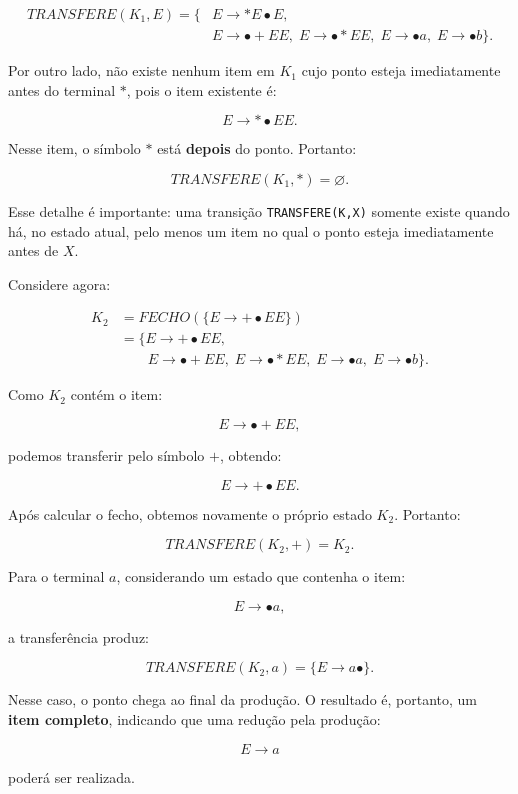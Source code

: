 \documentclass[
  brazilian,
  letterpaper,
]{book}
\theoremstyle{plain}
\theoremstyle{definition}
\theoremstyle{remark}
\begin{document}
\[
\begin{aligned}
TRANSFERE(K_1,E)=\{&
E\rightarrow*E\bullet E,\\
&
E\rightarrow\bullet +EE,\;
E\rightarrow\bullet *EE,\;
E\rightarrow\bullet a,\;
E\rightarrow\bullet b
\}.
\end{aligned}
\]

Por outro lado, não existe nenhum item em \(K_1\) cujo ponto esteja
imediatamente antes do terminal \(*\), pois o item existente é:

\[
E\rightarrow*\bullet EE.
\]

Nesse item, o símbolo \(*\) está \textbf{depois} do ponto. Portanto:

\[
TRANSFERE(K_1,*)=\varnothing.
\]

Esse detalhe é importante: uma transição \texttt{TRANSFERE(K,X)} somente
existe quando há, no estado atual, pelo menos um item no qual o ponto
esteja imediatamente antes de \(X\).

Considere agora:

\[
\begin{aligned}
K_2 &= FECHO(\{E\rightarrow +\bullet EE\}) \\
    &= \{E\rightarrow +\bullet EE, \\ 
    &\qquad E\rightarrow\bullet +EE,\; E\rightarrow\bullet *EE,\; E\rightarrow\bullet a,\; 
    E\rightarrow\bullet b\}.
\end{aligned}
\]

Como \(K_2\) contém o item:

\[
E\rightarrow \bullet +EE,
\]

podemos transferir pelo símbolo \(+\), obtendo:

\[
E\rightarrow+\bullet EE.
\]

Após calcular o fecho, obtemos novamente o próprio estado \(K_2\).
Portanto:

\[
TRANSFERE(K_2,+)=K_2.
\]

Para o terminal \(a\), considerando um estado que contenha o item:

\[
E\rightarrow\bullet a,
\]

a transferência produz:

\[
TRANSFERE(K_2,a)=\{E\rightarrow a\bullet\}.
\]

Nesse caso, o ponto chega ao final da produção. O resultado é, portanto,
um \textbf{item completo}, indicando que uma redução pela produção:

\[
E\rightarrow a
\]

poderá ser realizada.
\end{document}
